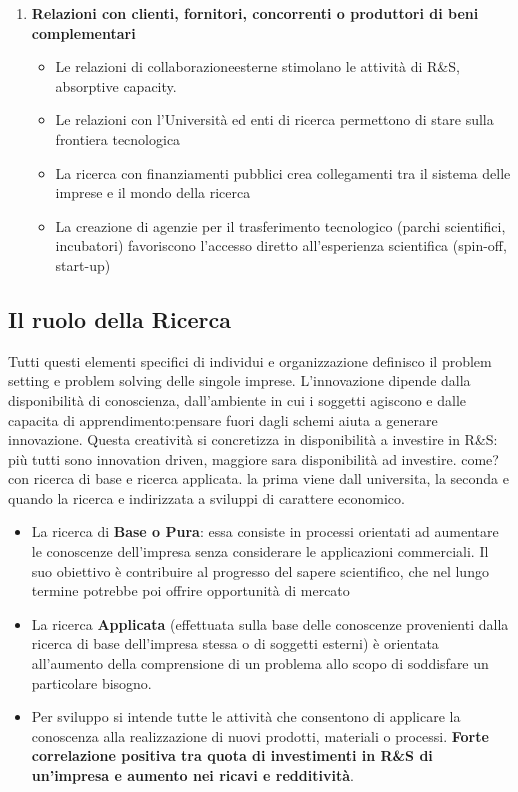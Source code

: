 \documentclass{article}
\begin{document}
\begin{enumerate}
	\item \textbf{Relazioni  con  clienti,  fornitori, concorrenti o produttori  di  beni complementari } 
	\begin{itemize}
		\item Le relazioni di collaborazioneesterne stimolano le attività di R\&S, absorptive capacity.
		\item Le relazioni con l’Università ed enti di ricerca permettono di stare sulla frontiera tecnologica
		\item La ricerca con finanziamenti pubblici crea collegamenti tra il sistema delle imprese e il mondo della ricerca 
		\item La creazione di agenzie per il trasferimento tecnologico (parchi scientifici, incubatori) favoriscono l’accesso diretto all’esperienza scientifica (spin-off, start-up)
	\end{itemize}
\end{enumerate}

\subsection{Il ruolo della Ricerca}
\noindent
Tutti questi elementi specifici di individui e organizzazione definisco il problem setting e problem solving delle singole imprese. L'innovazione dipende dalla disponibilità di conoscienza, dall'ambiente in cui i soggetti agiscono e dalle capacita di apprendimento:pensare fuori dagli schemi aiuta a generare innovazione. Questa creatività si concretizza in disponibilità a investire in R\&S: più tutti sono innovation driven, maggiore sara disponibilità ad investire. come? con ricerca di base e ricerca applicata. la prima viene dall universita, la seconda e quando la ricerca e indirizzata a sviluppi di carattere economico.

\begin{itemize}
\item La ricerca di \textbf{Base o Pura}: essa consiste in processi orientati ad aumentare le
conoscenze dell’impresa senza considerare le applicazioni commerciali. Il suo
obiettivo è contribuire al progresso del sapere scientifico, che nel lungo termine
potrebbe poi offrire opportunità di mercato
\item La ricerca \textbf{Applicata} (effettuata sulla base delle conoscenze provenienti dalla
ricerca di base dell’impresa stessa o di soggetti esterni) è orientata all’aumento
della comprensione di un problema allo scopo di soddisfare un particolare bisogno. 
\item Per sviluppo si intende tutte le attività che consentono di applicare la conoscenza alla
realizzazione di nuovi prodotti, materiali o processi.
\textbf{Forte correlazione positiva tra quota di investimenti in R\&S di un’impresa e aumento nei ricavi e redditività}.
\end{itemize}
\end{document}
